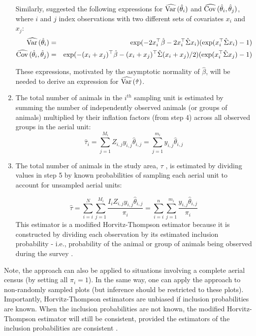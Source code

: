 \documentclass[nojss]{jss}
\def\VAR{{\rm Var}\,}
\def\COV{{\rm Cov}\,}
\begin{document}
\begin{enumerate}
Similarly, \citet{SS1989} suggested the following expressions for
$\widehat{\VAR}(\hat{\theta}_{i})$ and
$\widehat{\COV}(\hat{\theta}_{i}, \hat{\theta}_{j})$, where $i$ and
$j$ index observations with two different sets of covariates $x_{i}$
and $x_{j}$:
\begin{eqnarray}
\label{varthetahat} \widehat{\VAR}(\hat{\theta}_{i}) & = & \exp(-2x_{i}^{\top} \hat{\beta}-2x_{i}^{\top}\hat{\Sigma}x_{i})(\exp(x_{i}^{\top}\hat{\Sigma}x_{i})-1)\\
\label{covthetahat} \widehat{\COV}(\hat{\theta}_{i},
\hat{\theta}_{j}) & = &
\exp(-(x_{i}+x_{j})^{\top}\hat{\beta}-(x_{i}+x_{j})^{\top}\hat{\Sigma}(x_{i}+x_{j})/2)(\exp(x_{i}^{\top}\hat{\Sigma}x_{j})-1)
\end{eqnarray}

These expressions, motivated by the asymptotic normality of
$\hat{\beta}$, will be needed to derive an expression for
$\widehat{\VAR}(\hat{\tau})$.

\item The total number of animals in the $i^{th}$ sampling unit is estimated by summing the number of independently observed animals (or groups of
animals) multiplied by their inflation factors (from step 4) across
all observed groups in the aerial unit: $$\hat{\tau}_{i} =
\sum_{j=1}^{M_{i}}Z_{i,j}y_{i,j}\hat{\theta}_{i,j}=\sum_{j=1}^{m_{i}}y_{i,j}\hat{\theta}_{i,j}
$$
\item The total number of animals in the study area, $\tau$ , is estimated by dividing values in step 5 by known probabilities of sampling each aerial unit
 to account for unsampled aerial units:

\begin{equation}
  \label{tauhat}
  \hat{\tau}= \sum_{i=i}^{N}\sum_{j=1}^{M_{i}} \frac{I_{i}Z_{i,j}y_{i,j}\hat{\theta}_{i,j}}{\pi_{i}} =\sum_{i=i}^{n}\sum_{j=1}^{m_{i}} \frac{y_{i,j}\hat{\theta}_{i,j}}{\pi_{i}}
\end{equation}
This estimator is a modified Horvitz-Thompson estimator because it
is constructed by dividing each observation by its estimated
inclusion
 probability - i.e., probability of the animal or group of animals being observed during the survey \citep{SS1989, thompson2002}.
\end{enumerate}

Note, the approach can also be applied to situations involving a
complete aerial census (by setting all $\pi_{i} = 1$).  In the same
way,
 one can apply the approach to non-randomly sampled plots (but inference should be restricted to these plots). Importantly,
 Horvitz-Thompson estimators are unbiased if inclusion probabilities are known.  When the inclusion probabilities are not known, the modified Horvitz-Thompson
 estimator will still be consistent, provided the estimators of the inclusion probabilities are consistent \citep{thompson2002}.
\end{document}
